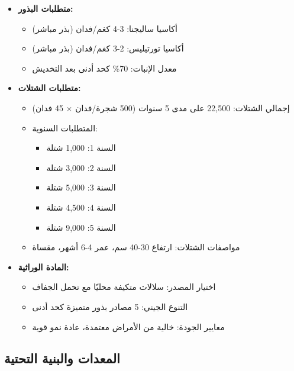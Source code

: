 \begin{itemize}
    \item \textbf{متطلبات البذور:}
    \begin{itemize}
        \item أكاسيا ساليجنا: 3-4 كغم/فدان (بذر مباشر)
        \item أكاسيا تورتيليس: 2-3 كغم/فدان (بذر مباشر)
        \item معدل الإنبات: 70\% كحد أدنى بعد التخديش
    \end{itemize}
    \item \textbf{متطلبات الشتلات:}
    \begin{itemize}
        \item إجمالي الشتلات: 22,500 على مدى 5 سنوات (500 شجرة/فدان × 45 فدان)
        \item المتطلبات السنوية:
        \begin{itemize}
            \item السنة 1: 1,000 شتلة
            \item السنة 2: 3,000 شتلة
            \item السنة 3: 5,000 شتلة
            \item السنة 4: 4,500 شتلة
            \item السنة 5: 9,000 شتلة
        \end{itemize}
        \item مواصفات الشتلات: ارتفاع 30-40 سم، عمر 4-6 أشهر، مقساة
    \end{itemize}
    \item \textbf{المادة الوراثية:}
    \begin{itemize}
        \item اختيار المصدر: سلالات متكيفة محليًا مع تحمل الجفاف
        \item التنوع الجيني: 5 مصادر بذور متميزة كحد أدنى
        \item معايير الجودة: خالية من الأمراض معتمدة، عادة نمو قوية
    \end{itemize}
\end{itemize}

\subsection{المعدات والبنية التحتية}

